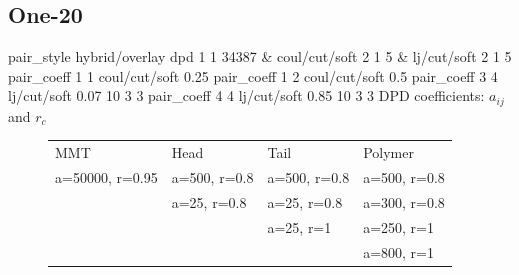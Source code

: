 \documentclass[a4paper]{article}
\begin{document}
\subsection*{One-20}
pair\_style hybrid/overlay dpd 1 1 34387 \& coul/cut/soft 2 1 5 \& 
lj/cut/soft 2 1 5\newline
pair\_coeff 1 1 coul/cut/soft 0.25
pair\_coeff 1 2 coul/cut/soft 0.5\newline
pair\_coeff 3 4 lj/cut/soft 0.07    10 3 3\newline
pair\_coeff 4 4 lj/cut/soft 0.85    10 3 3\newline
DPD coefficients: $a_{ij}$ and $r_c$
\begin{figure}[H]\begin{tabular}{llll}
MMT             & Head         & Tail         & Polymer      \\
a=50000, r=0.95 & a=500, r=0.8 & a=500, r=0.8 & a=500, r=0.8 \\
                & a=25,  r=0.8 & a=25,  r=0.8 & a=300, r=0.8 \\
                &              & a=25,  r=1   & a=250, r=1   \\
                &              &              & a=800, r=1   \\
\end{tabular}\end{figure}
\end{document}
